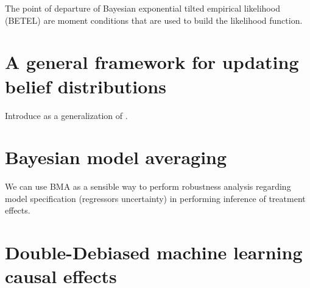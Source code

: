 The point of departure of Bayesian exponential tilted empirical likelihood (BETEL) are moment conditions that are used to build the likelihood function.

\section{A general framework for updating belief distributions}\label{sec12_9}
Introduce \cite{bissiri2016general} as a generalization of \cite{chernozhukov2003mcmc}.

\section{Bayesian model averaging}\label{sec12_10}
We can use BMA as a sensible way to perform robustness analysis regarding model specification (regressors uncertainty) in performing inference of treatment effects.

\section{Double-Debiased machine learning causal effects}\label{sec12_11}

